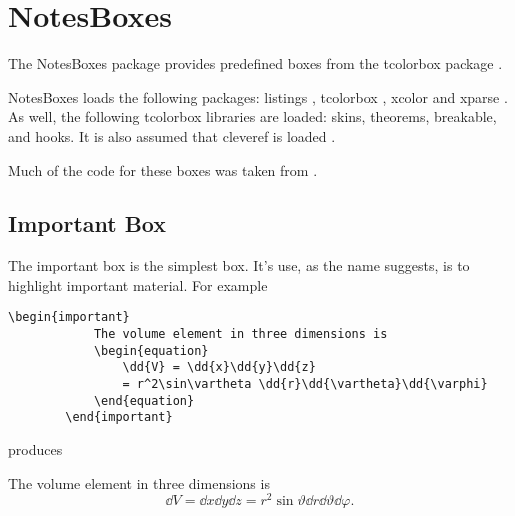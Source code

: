 \documentclass[fleqn, a4paper, openany]{memoir}
\newcommand{\package}[1]{{\textsf{\footnotesize #1}}}  %
\begin{document}
    \chapter{NotesBoxes}
    The \package{NotesBoxes} package provides predefined boxes from the \package{tcolorbox} package \cite{tcolorbox}.
    
    \package{NotesBoxes} loads the following packages: \package{listings} \cite{listings}, \package{tcolorbox} \cite{tcolorbox}, \package{xcolor} \cite{xcolor} and \package{xparse} \cite{xparse}.
    As well, the following \package{tcolorbox} libraries are loaded: \package{skins}, \package{theorems}, \package{breakable}, and \package{hooks}.
    It is also assumed that \package{cleveref} is loaded \cite{cleveref}.
    
    Much of the code for these boxes was taken from \cite{Gleason}.
    
    \section{Important Box}
    The important box is the simplest box.
    It's use, as the name suggests, is to highlight important material.
    For example
    \begin{Verbatim}[gobble=2]
        \begin{important}
            The volume element in three dimensions is
            \begin{equation}
                \dd{V} = \dd{x}\dd{y}\dd{z} 
                = r^2\sin\vartheta \dd{r}\dd{\vartheta}\dd{\varphi}
            \end{equation}
        \end{important}
    \end{Verbatim}
    produces
    \begin{important}
        The volume element in three dimensions is
        \begin{equation}
            \dd{V} = \dd{x}\dd{y}\dd{z} 
            = r^2\sin\vartheta \dd{r}\dd{\vartheta}\dd{\varphi}.
        \end{equation}
    \end{important}
    
\end{document}
